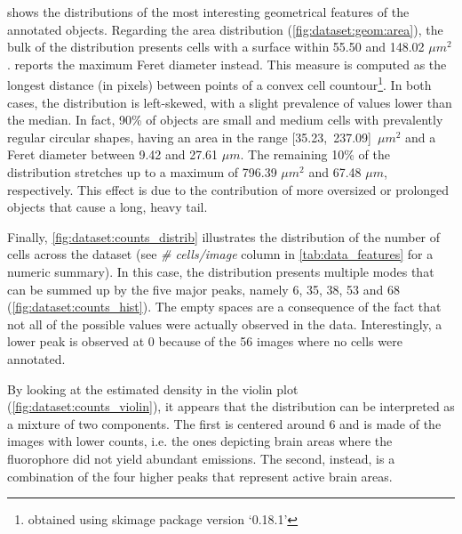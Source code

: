  shows the distributions of the most interesting geometrical features of the annotated objects.
Regarding the area distribution (\cref{fig:dataset:geom:area}), the bulk of the distribution presents cells with a surface within 55.50 and 148.02  $\mu m^2$.
 reports the maximum Feret diameter \cite{merkus2009particle} instead. This measure is computed as the longest distance (in pixels) between points of a convex cell countour\footnote{obtained using skimage package version `0.18.1'}.
In both cases, the distribution is left-skewed, with a slight prevalence of values lower than the median.
In fact, 90\% of objects are small and medium cells with prevalently regular circular shapes, having an area in the range \mbox{[35.23, 237.09]  $\mu m^2$} and a Feret diameter between 9.42 and 27.61  $\mu m$.
The remaining 10\% of the distribution stretches up to a maximum of 796.39  $\mu m^2$ and 67.48 $\mu m$, respectively.
This effect is due to the contribution of more oversized or prolonged objects that cause a long, heavy tail.

Finally, \ref{fig:dataset:counts_distrib} illustrates the distribution of the number of cells across the dataset (see \textit{\# cells/image} column in \cref{tab:data_features} for a numeric summary).
In this case, the distribution presents multiple modes that can be summed up by the five major peaks, namely 6, 35, 38, 53 and 68
(\cref{fig:dataset:counts_hist}).
The empty spaces are a consequence of the fact that not all of the possible values were actually observed in the data.
Interestingly, a lower peak is observed at 0 because of the 56 images where no cells were annotated.

By looking at the estimated density in the violin plot (\cref{fig:dataset:counts_violin}), it appears that the distribution can be interpreted as a mixture of two components.
The first is centered around 6 and is made of the images with lower counts, i.e. the ones depicting brain areas where the fluorophore did not yield abundant emissions.
The second, instead, is a combination of the four higher peaks that represent active brain areas.


